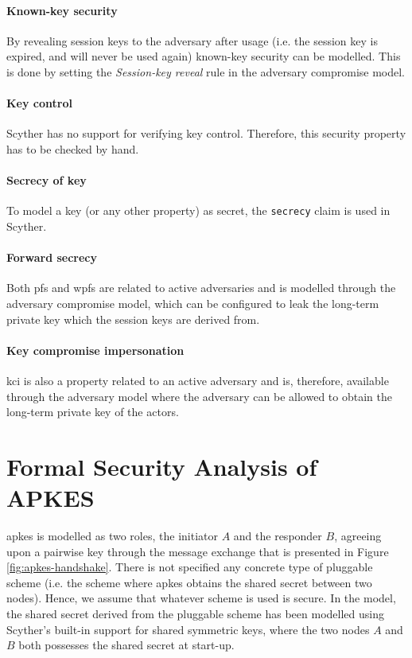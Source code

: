 \paragraph{Known-key security} By revealing session keys to the adversary after usage (i.e. the session key is expired, and will never be used again) known-key security can be modelled. This is done by setting the \emph{Session-key reveal} rule in the adversary compromise model.

\paragraph{Key control} Scyther has no support for verifying key control. Therefore, this security property has to be checked by hand. 

\paragraph{Secrecy of key} To model a key (or any other property) as secret, the \texttt{secrecy} claim is used in Scyther.

\paragraph{Forward secrecy} Both \gls{pfs} and \gls{wpfs} are related to active adversaries and is modelled through the adversary compromise model, which can be configured to leak the long-term private key which the session keys are derived from.

\paragraph{Key compromise impersonation} \gls{kci} is also a property related to an active adversary and is, therefore, available through the adversary model where the adversary can be allowed to obtain the long-term private key of the actors.


\section{Formal Security Analysis of APKES}
\label{sec:apkes-analysis}

\gls{apkes} is modelled as two roles, the initiator $A$ and the responder $B$, agreeing upon a pairwise key through the message exchange that is presented in Figure \ref{fig:apkes-handshake}. There is not specified any concrete type of pluggable scheme (i.e. the scheme where \gls{apkes} obtains the shared secret between two nodes). Hence, we assume that whatever scheme is used is secure. In the model, the shared secret derived from the pluggable scheme has been modelled using Scyther's built-in support for shared symmetric keys, where the two nodes $A$ and $B$ both possesses the shared secret at start-up.

